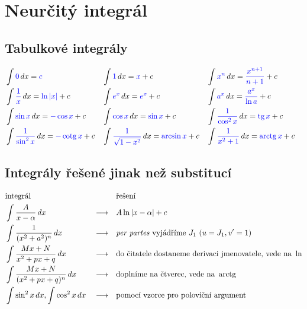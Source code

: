 \section{Neurčitý integrál}\label{appint}
\subsection*{Tabulkové integrály}
\begin{align*}
&\int \textcolor{blue}{0} \, dx = \textcolor{blue}{c} & & \int \textcolor{blue}{1}\,  dx = \textcolor{blue}{x}+c & & \int \textcolor{blue}{x^n} \, dx = \textcolor{blue}{\frac{x^{n+1}}{n+1}}+c \\
&\int \textcolor{blue}{\frac{1}{x}} \, dx = \textcolor{blue}{\operatorname{ln} |x|} + c & & \int \textcolor{blue}{e^x}\, dx = \textcolor{blue}{e^x}+c & &  \int \textcolor{blue}{a^x} \, dx = \textcolor{blue}{\frac{a^x}{\operatorname{ln} a}} + c \\
&\int \textcolor{blue}{\sin x} \, dx = \textcolor{blue}{-\cos x} + c & & \int \textcolor{blue}{\cos x} \, dx = \textcolor{blue}{\sin x} +c & &\int \textcolor{blue}{\frac{1}{\cos^2 x}}\, dx = \textcolor{blue}{\operatorname{tg} x} + c \\
&\int \textcolor{blue}{\frac{1}{\sin^2 x}} \, dx = \textcolor{blue}{-\operatorname{cotg} x}+c & & \int \textcolor{blue}{\frac{1}{\sqrt{1-x^2} }}\, dx = \textcolor{blue}{\arcsin x} + c & &\int \textcolor{blue}{\frac{1}{x^2+1}}\, dx = \textcolor{blue}{\operatorname{arctg} x} + c&
\end{align*}

\subsection*{Integrály řešené jinak než substitucí}
\begin{align*}
    &\textrm{integrál}                        & &                 & & \textrm{řešení} \\
    &\int \frac{A}{x-\alpha}\, dx             & & \longrightarrow & & A\operatorname{ln}|x-\alpha|+c \\
    &\int \frac{1}{(x^2+a^2)^n}\, dx          & & \longrightarrow & & \textit{per partes } \textrm{vyjádříme } J_1 \textrm{ ($u=J_1, v^\prime=1$)}\\
    &\int \frac{Mx+N}{x^2+px+q}\, dx          & & \longrightarrow & & \textrm{do čitatele dostaneme derivaci jmenovatele, vede na } \operatorname{ln} \\
    &\int \frac{Mx+N}{(x^2+px+q)^n}\, dx      & & \longrightarrow & & \textrm{doplníme na čtverec, vede na } \operatorname{arctg}  \\
    &\int \sin^2 x\, dx, \int \cos^2 x \, dx  & & \longrightarrow & & \textrm{pomocí vzorce pro poloviční argument}
\end{align*}

